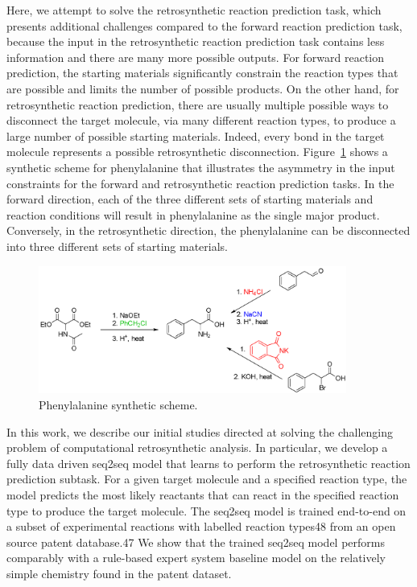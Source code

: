 Here, we attempt to solve the retrosynthetic reaction prediction task, which presents additional challenges compared to the forward reaction prediction task, because the input in the retrosynthetic reaction prediction task contains less information and there are many more possible outputs. For forward reaction prediction, the starting materials significantly constrain the reaction types that are possible and limits the number of possible products. On the other hand, for retrosynthetic reaction prediction, there are usually multiple possible ways to disconnect the target molecule, via many different reaction types, to produce a large number of possible starting materials. Indeed, every bond in the target molecule represents a possible retrosynthetic disconnection. Figure~\ref{fig:phenyl} shows a synthetic scheme for phenylalanine that illustrates the asymmetry in the input constraints for the forward and retrosynthetic reaction prediction tasks. In the forward direction, each of the three different sets of starting materials and reaction conditions will result in phenylalanine as the single major product. Conversely, in the retrosynthetic direction, the phenylalanine can be disconnected into three different sets of starting materials. 

\begin{figure}
  \centering
  \includegraphics[width=0.9\textwidth]{Images/phenylalanine_synth.png}
  \caption{Phenylalanine synthetic scheme.}
  \label{fig:phenyl}
\end{figure}

In this work, we describe our initial studies directed at solving the challenging problem of computational retrosynthetic analysis. In particular, we develop a fully data driven seq2seq model that learns to perform the retrosynthetic reaction prediction subtask. For a given target molecule and a specified reaction type, the model predicts the most likely reactants that can react in the specified reaction type to produce the target molecule. The seq2seq model is trained end-to-end on a subset of experimental reactions with labelled reaction types48 from an open source patent database.47 We show that the trained seq2seq model performs comparably with a rule-based expert system baseline model on the relatively simple chemistry found in the patent dataset. 

